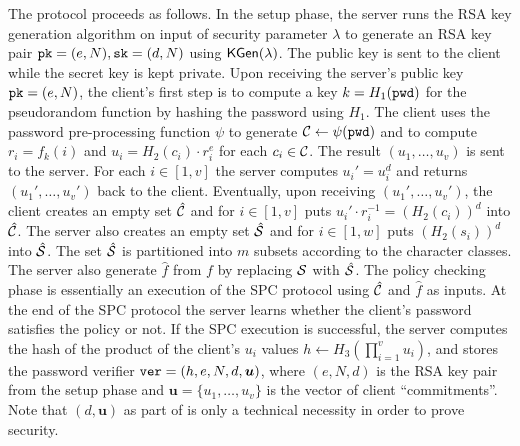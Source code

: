 The protocol proceeds as follows. 
In the setup phase, the server runs the RSA key generation algorithm on input of security parameter $\lambda$ to generate an RSA key pair $\mathtt{pk}=(e,N), \mathtt{sk}=(d,N)$ using $\mathsf{KGen}(\lambda)$. 
The public key is sent to the client while the secret key is kept private. 
Upon receiving the server's public key $\mathtt{pk}=(e,N)$, the client's first step is to compute a key $k=H_1(\mathtt{pwd})$ for the pseudorandom function by hashing the password using $H_1$. The client uses the password pre-processing function $\psi$ to generate $\mathcal{C}\gets\psi(\mathtt{pwd})$ and to compute $r_i=f_k(i)$ and $u_i=H_2(c_i)\cdot r_i^e$ for each $c_i\in\mathcal{C}$.
The result $(u_1,\ldots,u_v)$ is sent to the server.
For each $i\in[1,v]$ the server computes $u_i'=u_i^d$ and returns $(u_1',\ldots,u_v')$ back to the client. 
Eventually, upon receiving $(u_1',\ldots,u_v')$, the client creates an empty set $\hat{\mathcal{C}}$ and for $i\in[1,v]$ puts $u_i'\cdot r_i^{-1}=(H_2(c_i))^d$ into $\hat{\mathcal{C}}$. 
The server also creates an empty set $\hat{\mathcal{S}}$ and for $i\in[1,w]$ puts $(H_2(s_i))^d$ into $\hat{\mathcal{S}}$. The set $\hat{\mathcal{S}}$ is partitioned into $m$ subsets according to the character classes. 
The server also generate $\hat{f}$ from $f$ by replacing $\mathcal{S}$ with $\hat{\mathcal{S}}$.
The policy checking phase is essentially an execution of  the \ac{SPC} protocol using $\hat{\mathcal{C}}$ and $\hat{f}$ as inputs. 
At the end of the \ac{SPC} protocol the server learns whether the client's password satisfies the policy or not. 
If the \ac{SPC} execution is successful, the server computes the hash of the product of the client's $u_i$ values $h\gets H_3(\prod_{i=1}^v u_i)$, and stores the password verifier $\mathtt{ver} = (h,e,N,d,\bm{u})$, where $(e,N,d)$ is the RSA key pair from the setup phase and $\bm{u}=\{u_1,\dots,u_v\}$ is the vector of client ``commitments''.
Note that $(d, \bm{u})$ as part of \ver is only a technical necessity in order to prove security.


